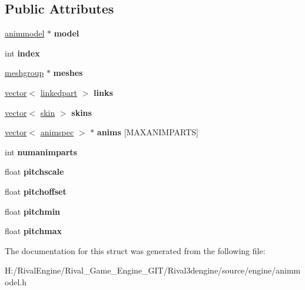 \subsection*{Public Attributes}
\begin{DoxyCompactItemize}
\item 
\mbox{\label{structanimmodel_1_1part_a7c0aaf8e84e9def992b6ede63c949917}} 
\hyperlink{structanimmodel}{animmodel} $\ast$ {\bfseries model}
\item 
\mbox{\label{structanimmodel_1_1part_a84b57a493f7cea7b8508ba50128dc7ae}} 
int {\bfseries index}
\item 
\mbox{\label{structanimmodel_1_1part_ad40451191b8d4f2343aa1f5b0d9705a9}} 
\hyperlink{structanimmodel_1_1meshgroup}{meshgroup} $\ast$ {\bfseries meshes}
\item 
\mbox{\label{structanimmodel_1_1part_aba01ebea6bdc866b9828d12b65c29a35}} 
\hyperlink{structvector}{vector}$<$ \hyperlink{structanimmodel_1_1linkedpart}{linkedpart} $>$ {\bfseries links}
\item 
\mbox{\label{structanimmodel_1_1part_a5fde4f5a6c1a8c0be4cf3b0640207a44}} 
\hyperlink{structvector}{vector}$<$ \hyperlink{structanimmodel_1_1skin}{skin} $>$ {\bfseries skins}
\item 
\mbox{\label{structanimmodel_1_1part_a9d008aeebcc71e3dd657d4f496ddab23}} 
\hyperlink{structvector}{vector}$<$ \hyperlink{structanimmodel_1_1animspec}{animspec} $>$ $\ast$ {\bfseries anims} \mbox{[}M\+A\+X\+A\+N\+I\+M\+P\+A\+R\+TS\mbox{]}
\item 
\mbox{\label{structanimmodel_1_1part_ae5fe19cc3de3251617666050b1b2153b}} 
int {\bfseries numanimparts}
\item 
\mbox{\label{structanimmodel_1_1part_a1b2fa79e7811ba9ed3ec2f5d93b9c684}} 
float {\bfseries pitchscale}
\item 
\mbox{\label{structanimmodel_1_1part_a75412bbc23543e0cdf448e795d245044}} 
float {\bfseries pitchoffset}
\item 
\mbox{\label{structanimmodel_1_1part_ac400ca437f87f5fee1c63207fc51cf2e}} 
float {\bfseries pitchmin}
\item 
\mbox{\label{structanimmodel_1_1part_a4ac08fd84281f50513256623bedd1460}} 
float {\bfseries pitchmax}
\end{DoxyCompactItemize}


The documentation for this struct was generated from the following file\+:\begin{DoxyCompactItemize}
\item 
H\+:/\+Rival\+Engine/\+Rival\+\_\+\+Game\+\_\+\+Engine\+\_\+\+G\+I\+T/\+Rival3dengine/source/engine/animmodel.\+h\end{DoxyCompactItemize}
